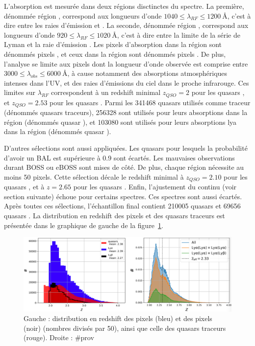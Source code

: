 \documentclass[11pt, twoside, a4paper, openright]{report}
\begin{document}
L'absorption \lya{} est mesurée dans deux régions disctinctes du spectre. La première, dénommée région \lya{}, correspond aux longueurs d'onde $\num{1040} \leq \lambda_{RF} \leq \SI{1200}{\angstrom}$, c'est à dire entre les raies d'émission \lyb{} et \lya{}. La seconde, dénommée région \lyb{}, correspond aux longueurs d'onde $\num{920} \leq \lambda_{RF} \leq \SI{1020}{\angstrom}$, c'est à dire entre la limite de la série de Lyman et la raie d'émission \lyb{}. Les pixels d'absorption \lya{} dans la région \lya{} sont dénommés pixels \lyalya{}, et ceux dans la région \lyb{} sont dénommés pixels \lyalyb{}.
De plus, l'analyse se limite aux pixels dont la longueur d'onde observée est comprise entre $\num{3000} \leq \lambda_{obs} \leq \SI{6000}{\angstrom}$, à cause notamment des absorptions atmosphériques intenses dans l'UV, et des raies d'émissions du ciel dans le proche infrarouge. Ces limites sur $\lambda_{RF}$ correspondent à un redshift minimal $z_{QSO} = 2$ pour les quasars \lya{}, et $z_{QSO} = 2.53$ pour les quasars \lyb{}. Parmi les \num{341468} quasars utilisés comme traceur (dénommés quasars traceurs), \num{256328} sont utilisés pour leurs absorptions \lya{} dans la région \lya (dénommés quasar \lya{}), et \num{103080} sont utilisés pour leurs absorptions lya{} dans la région \lyb{} (dénommés quasar \lyb{}).

D'autres sélections sont aussi appliquées. Les quasars pour lesquels la probabilité d'avoir un BAL est supérieure à 0.9 sont écartés. Les mauvaises observations durant BOSS ou eBOSS sont mises de côté. De plus, chaque région nécessite au moins 50 pixels. Cette sélection décale le redshift minimal à $z_{QSO} = 2.10$ pour les quasars \lya{}, et à $z = 2.65$ pour les quasars \lyb{}. Enfin, l'ajustement du continu (voir section suivante) échoue pour certains spectres. Ces spectres sont aussi écartés.
Après toutes ces sélections, l'échantillon final contient \num{210005} quasars \lya{} et \num{69656} quasars \lyb{}.
La distribution en redshift des pixels et des quasars traceurs est présentée dans le graphique de gauche de la figure~\ref{fig:pixel_number}.
\begin{figure}
  \centering
  \includegraphics[scale=0.4]{pixel_number}
  \caption{Gauche : distribution en redshift des pixels \lyalya{} (bleu) et des pixels\lyalyb{} (noir) (nombres divisés par 50), ainsi que celle des quasars traceurs (rouge). Droite : \#prov}
  \label{fig:pixel_number}
\end{figure}





\end{document}
